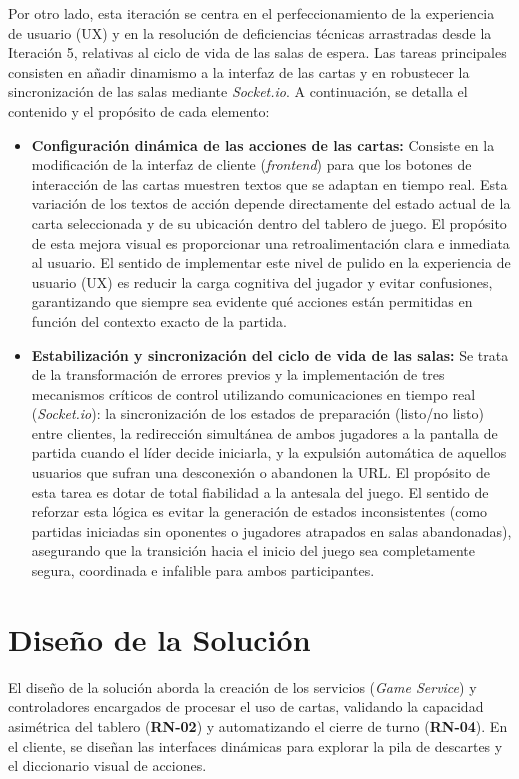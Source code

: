 Por otro lado, esta iteración se centra en el perfeccionamiento de la experiencia de usuario (UX) y en la resolución de deficiencias técnicas arrastradas desde la Iteración 5, relativas al ciclo de vida de las salas de espera. Las tareas principales consisten en añadir dinamismo a la interfaz de las cartas y en robustecer la sincronización de las salas mediante \textit{Socket.io}. A continuación, se detalla el contenido y el propósito de cada elemento:

\begin{itemize}
    \item \textbf{Configuración dinámica de las acciones de las cartas:} Consiste en la modificación de la interfaz de cliente (\textit{frontend}) para que los botones de interacción de las cartas muestren textos que se adaptan en tiempo real. Esta variación de los textos de acción depende directamente del estado actual de la carta seleccionada y de su ubicación dentro del tablero de juego. El propósito de esta mejora visual es proporcionar una retroalimentación clara e inmediata al usuario. El sentido de implementar este nivel de pulido en la experiencia de usuario (UX) es reducir la carga cognitiva del jugador y evitar confusiones, garantizando que siempre sea evidente qué acciones están permitidas en función del contexto exacto de la partida.
    \item \textbf{Estabilización y sincronización del ciclo de vida de las salas:} Se trata de la transformación de errores previos y la implementación de tres mecanismos críticos de control utilizando comunicaciones en tiempo real (\textit{Socket.io}): la sincronización de los estados de preparación (listo/no listo) entre clientes, la redirección simultánea de ambos jugadores a la pantalla de partida cuando el líder decide iniciarla, y la expulsión automática de aquellos usuarios que sufran una desconexión o abandonen la URL. El propósito de esta tarea es dotar de total fiabilidad a la antesala del juego. El sentido de reforzar esta lógica es evitar la generación de estados inconsistentes (como partidas iniciadas sin oponentes o jugadores atrapados en salas abandonadas), asegurando que la transición hacia el inicio del juego sea completamente segura, coordinada e infalible para ambos participantes.
\end{itemize}

\section{Diseño de la Solución}
El diseño de la solución aborda la creación de los servicios (\textit{Game Service}) y controladores encargados de procesar el uso de cartas, validando la capacidad asimétrica del tablero (\textbf{RN-02}) y automatizando el cierre de turno (\textbf{RN-04}). En el cliente, se diseñan las interfaces dinámicas para explorar la pila de descartes y el diccionario visual de acciones.

